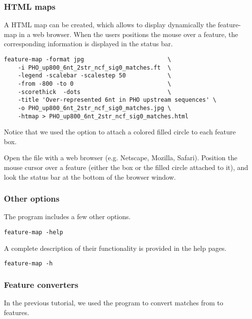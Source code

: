 \subsubsection{HTML maps}

A HTML map can be created, which allows to display dynamically the
feature-map in a web browser. When the users positions the mouse over
a feature, the corresponding information is displayed in the status
bar.

\begin{verbatim}
feature-map -format jpg                        \
    -i PHO_up800_6nt_2str_ncf_sig0_matches.ft  \
    -legend -scalebar -scalestep 50            \
    -from -800 -to 0                           \
    -scorethick  -dots                         \
    -title 'Over-represented 6nt in PHO upstream sequences' \
    -o PHO_up800_6nt_2str_ncf_sig0_matches.jpg \
    -htmap > PHO_up800_6nt_2str_ncf_sig0_matches.html
\end{verbatim}

Notice that we used the option \option{-dot} to attach a colored filled 
circle to each feature box. 

Open the file 
with a web browser (e.g. Netscape, Mozilla, Safari). Position the
mouse cursor over a feature (either the box or the filled circle
attached to it), and look the status bar at the bottom of the browser
window.

\subsubsection{Other options}

The program \program{feature-map} includes a few other options.

\begin{verbatim}
feature-map -help
\end{verbatim}

A complete description of their functionality is provided in 
the help pages.

\begin{verbatim}
feature-map -h
\end{verbatim}

\subsubsection{Feature converters}

In the previous tutorial, we used the program
 to convert matches from
 to features. 

